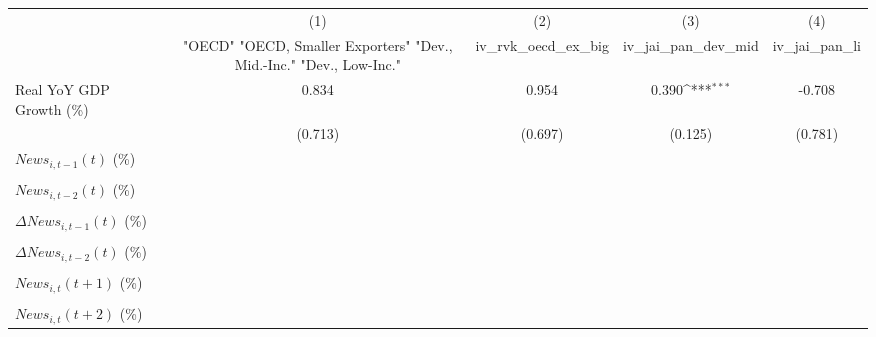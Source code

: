 {
\def\sym#1{\ifmmode^{#1}\else\(^{#1}\)\fi}
\begin{tabular}{l*{4}{c}}
\toprule
                    &\multicolumn{1}{c}{(1)}&\multicolumn{1}{c}{(2)}&\multicolumn{1}{c}{(3)}&\multicolumn{1}{c}{(4)}\\
                    &\multicolumn{1}{c}{ "OECD" "OECD, Smaller Exporters" "Dev., Mid.-Inc." "Dev., Low-Inc."}&\multicolumn{1}{c}{iv_rvk_oecd_ex_big}&\multicolumn{1}{c}{iv_jai_pan_dev_mid}&\multicolumn{1}{c}{iv_jai_pan_li}\\
\midrule
Real YoY GDP Growth (\%)&       0.834         &       0.954         &       0.390\sym{***}&      -0.708         \\
                    &     (0.713)         &     (0.697)         &     (0.125)         &     (0.781)         \\
\addlinespace
$ News_{i,t-1}(t)$ (\%)&                     &                     &                     &                     \\
                    &                     &                     &                     &                     \\
\addlinespace
$ News_{i,t-2}(t)$ (\%)&                     &                     &                     &                     \\
                    &                     &                     &                     &                     \\
\addlinespace
$ \Delta News_{i,t-1}(t)$ (\%)&                     &                     &                     &                     \\
                    &                     &                     &                     &                     \\
\addlinespace
$ \Delta News_{i,t-2}(t)$ (\%)&                     &                     &                     &                     \\
                    &                     &                     &                     &                     \\
\addlinespace
$ News_{i,t}(t+1)$ (\%)&                     &                     &                     &                     \\
                    &                     &                     &                     &                     \\
\addlinespace
$ News_{i,t}(t+2)$ (\%)&                     &                     &                     &                     \\

\end{tabular}}

